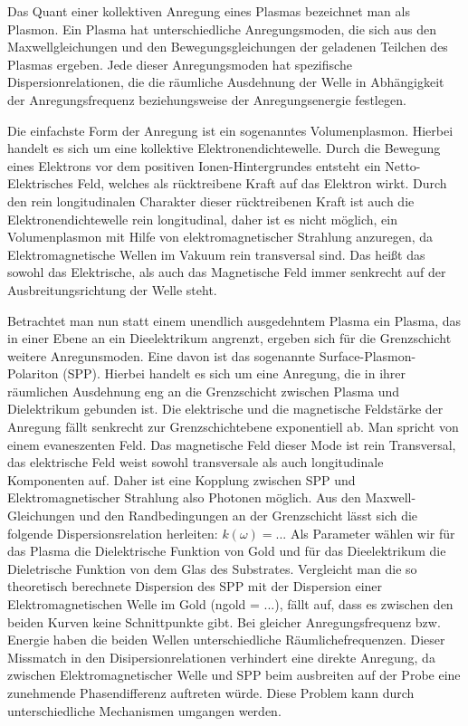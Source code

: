 Das Quant einer kollektiven Anregung eines Plasmas bezeichnet man als Plasmon. Ein Plasma hat unterschiedliche Anregungsmoden, die sich aus den Maxwellgleichungen und den Bewegungsgleichungen der geladenen Teilchen des Plasmas ergeben. Jede dieser Anregungsmoden hat spezifische Dispersionrelationen, die die räumliche Ausdehnung der Welle in Abhängigkeit der Anregungsfrequenz beziehungsweise der Anregungsenergie festlegen.

Die einfachste Form der Anregung ist ein sogenanntes Volumenplasmon. Hierbei handelt es sich um eine kollektive Elektronendichtewelle. Durch die Bewegung eines Elektrons vor dem positiven Ionen-Hintergrundes entsteht ein Netto-Elektrisches Feld, welches als rücktreibene Kraft auf das Elektron wirkt. Durch den rein longitudinalen Charakter dieser rücktreibenen Kraft ist auch die Elektronendichtewelle rein longitudinal, daher ist es nicht möglich, ein Volumenplasmon mit Hilfe von elektromagnetischer Strahlung anzuregen, da Elektromagnetische Wellen im Vakuum rein transversal sind. Das heißt das sowohl das Elektrische, als auch das Magnetische Feld immer senkrecht auf der Ausbreitungsrichtung der Welle steht.

Betrachtet man nun statt einem unendlich ausgedehntem Plasma ein Plasma, das in einer Ebene an ein Dieelektrikum angrenzt, ergeben sich für die Grenzschicht weitere Anregunsmoden. Eine davon ist das sogenannte Surface-Plasmon-Polariton (SPP). Hierbei handelt es sich um eine Anregung, die in ihrer räumlichen Ausdehnung eng an die Grenzschicht zwischen Plasma und Dielektrikum gebunden ist. Die elektrische und die magnetische Feldstärke der Anregung fällt senkrecht zur Grenzschichtebene exponentiell ab. Man spricht von einem evaneszenten Feld. Das magnetische Feld dieser Mode ist rein Transversal, das elektrische Feld weist sowohl transversale als auch longitudinale Komponenten auf. Daher ist eine Kopplung zwischen SPP und Elektromagnetischer Strahlung also Photonen möglich. Aus den Maxwell-Gleichungen und den Randbedingungen an der Grenzschicht lässt sich die folgende Dispersionsrelation herleiten: $k(\omega) = ...$ Als Parameter wählen wir für das Plasma die Dielektrische Funktion von Gold und für das Dieelektrikum die Dieletrische Funktion von dem Glas des Substrates. Vergleicht man die so theoretisch berechnete Dispersion des SPP mit der Dispersion einer Elektromagnetischen Welle im Gold (ngold = ...), fällt auf, dass es zwischen den beiden Kurven keine Schnittpunkte gibt. Bei gleicher Anregungsfrequenz bzw. Energie haben die beiden Wellen unterschiedliche Räumlichefrequenzen. Dieser Missmatch in den Disipersionrelationen verhindert eine direkte Anregung, da zwischen Elektromagnetischer Welle und SPP beim ausbreiten auf der Probe eine zunehmende Phasendifferenz auftreten würde. Diese Problem kann durch unterschiedliche Mechanismen umgangen werden. 



